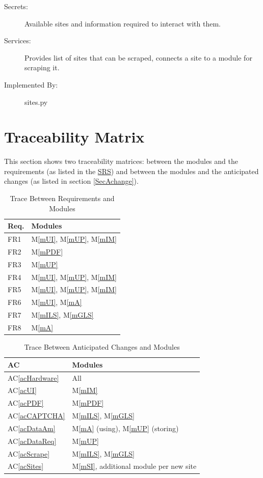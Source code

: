 \documentclass[12pt, titlepage]{article}
\newcommand{\acref}[1]{AC\ref{#1}}
\newcommand{\mref}[1]{M\ref{#1}}
\begin{document}
\begin{description}
\item[Secrets:] Available sites and information required to interact with them.
\item[Services:] Provides list of sites that can be scraped, connects a site to a module for scraping it.
\item[Implemented By:] sites.py
\end{description}

\section{Traceability Matrix} \label{SecTM}

This section shows two traceability matrices: between the modules and the
requirements (as listed in the \href{https://gitlab.cas.mcmaster.ca/jamesong/application_3xa3_l01_grp05/-/blob/main/Doc/SRS}{SRS}) and between the modules and the anticipated changes (as listed in section \ref{SecAchange}).

\begin{table}[H]
\centering
\begin{tabular}{p{} p{}}
\toprule
\textbf{Req.} & \textbf{Modules}\\
\midrule
FR1 & \mref{mUI}, \mref{mUP}, \mref{mIM}\\
FR2 & \mref{mPDF}\\
FR3 & \mref{mUP}\\
FR4 & \mref{mUI}, \mref{mUP}, \mref{mIM}\\
FR5 & \mref{mUI}, \mref{mUP}, \mref{mIM}\\
FR6 & \mref{mUI}, \mref{mA}\\
FR7 & \mref{mILS}, \mref{mGLS}\\ 
FR8 & \mref{mA}\\
\bottomrule
\end{tabular}
\caption{Trace Between Requirements and Modules}
\label{TblRT}
\end{table}

\begin{table}[H]
\centering
\begin{tabular}{p{} p{}}
\toprule
\textbf{AC} & \textbf{Modules}\\
\midrule
\acref{acHardware} & All\\
\acref{acUI} & \mref{mIM}\\
\acref{acPDF} & \mref{mPDF}\\
\acref{acCAPTCHA} & \mref{mILS}, \mref{mGLS}\\
\acref{acDataAm} & \mref{mA} (using), \mref{mUP} (storing)\\
\acref{acDataReq} & \mref{mUP}\\
\acref{acScrape} & \mref{mILS}, \mref{mGLS}\\
\acref{acSites} & \mref{mSI}, additional module per new site\\
\bottomrule
\end{tabular}
\caption{Trace Between Anticipated Changes and Modules}
\label{TblACT}
\end{table}
\end{document}
